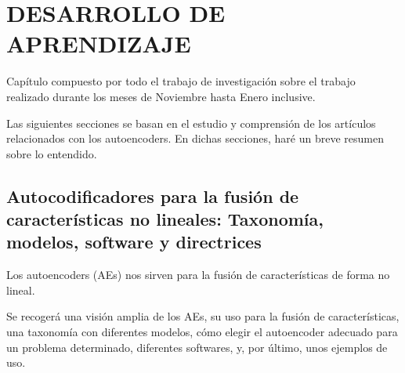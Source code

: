 
\chapter{DESARROLLO DE APRENDIZAJE}

Capítulo compuesto por todo el trabajo de investigación sobre el trabajo realizado durante los meses de Noviembre hasta Enero inclusive.

Las siguientes secciones se basan en el estudio y comprensión de los artículos relacionados con los autoencoders. En dichas secciones, haré un breve resumen sobre lo entendido.

\section{Autocodificadores para la fusión de características no lineales: Taxonomía, modelos, software y directrices}

Los autoencoders (AEs) nos sirven para la fusión de características de forma no lineal.

Se recogerá una visión amplia de los AEs, su uso para la fusión de características, una taxonomía con diferentes modelos, cómo elegir el autoencoder adecuado para un problema determinado, diferentes softwares, y, por último, unos ejemplos de uso.

